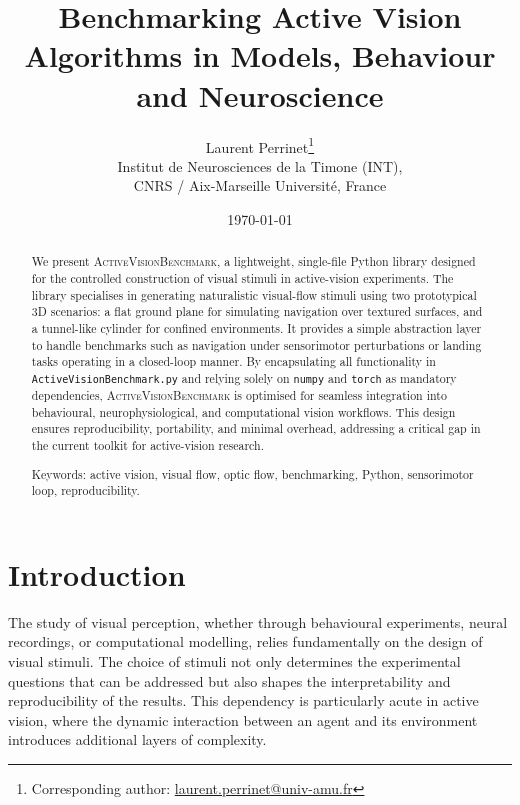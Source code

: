 \documentclass[12pt,a4paper]{article}
\title{Benchmarking Active Vision Algorithms in Models, Behaviour and Neuroscience}
\author{
  Laurent Perrinet\thanks{Corresponding author: \href{mailto:laurent.perrinet@univ-amu.fr}{laurent.perrinet@univ-amu.fr}}\\
  \small Institut de Neurosciences de la Timone (INT),\\
  \small CNRS / Aix-Marseille Université, France
}
\date{\today}
\newcommand{\avb}{\textsc{ActiveVisionBenchmark}}  %
\begin{document}
\linenumbers

\maketitle

\begin{abstract}
We present \avb{}, a lightweight, single-file Python library designed for the controlled construction of visual stimuli in active-vision experiments. The library specialises in generating naturalistic visual-flow stimuli using two prototypical 3D scenarios: a flat ground plane for simulating navigation over textured surfaces, and a tunnel-like cylinder for confined environments. It provides a simple abstraction layer to handle benchmarks such as navigation under sensorimotor perturbations or landing tasks operating in a closed-loop manner. By encapsulating all functionality in \texttt{ActiveVisionBenchmark.py} and relying solely on \texttt{numpy} and \texttt{torch} as mandatory dependencies, \avb{} is optimised for seamless integration into behavioural, neurophysiological, and computational vision workflows. This design ensures reproducibility, portability, and minimal overhead, addressing a critical gap in the current toolkit for active-vision research.

Keywords: active vision, visual flow, optic flow, benchmarking, Python, sensorimotor loop, reproducibility.
\end{abstract}

\section{Introduction}
\label{sec:intro}

The study of visual perception, whether through behavioural experiments, neural recordings, or computational modelling, relies fundamentally on the design of visual stimuli. The choice of stimuli not only determines the experimental questions that can be addressed but also shapes the interpretability and reproducibility of the results. This dependency is particularly acute in active vision, where the dynamic interaction between an agent and its environment introduces additional layers of complexity.
\end{document}
